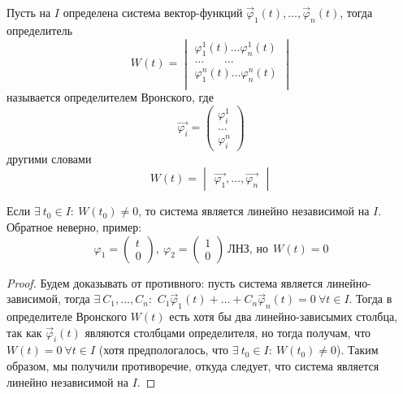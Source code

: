 \begin{definition}
    Пусть на $I$ определена система вектор-функций $\vec \varphi_1(t), \dots, \vec \varphi_n(t)$, тогда определитель
    \begin{equation}
        W(t) = 
        \begin{vmatrix}
            \varphi^1_1(t) \dots \varphi^1_n(t) \\
            \dots ~~~~~~~~ \dots \\
            \varphi^n_1(t) \dots \varphi^n_n(t) \\
        \end{vmatrix}
    \end{equation}
    называется определителем Вронского, где
    \begin{equation}
        \vec{\varphi_i} = 
        \begin{pmatrix}
            \varphi_i^1 \\
            \dots \\
            \varphi_i^n
        \end{pmatrix}
    \end{equation}
    другими словами
    \begin{equation}
    W(t) = 
    \begin{vmatrix}
    \vec{\varphi_1}, \dots, \vec{\varphi_n}
    \end{vmatrix}
    \end{equation}
\end{definition}

\begin{theorem}
    Если $\exists ~ t_0 \in I : ~ W(t_0) \neq 0$, то система является линейно независимой на $I$. Обратное неверно,
    пример:
    \begin{equation}
        \varphi_1 = 
        \begin{pmatrix}
            t \\
            0
        \end{pmatrix}, ~
        \varphi_2 = 
        \begin{pmatrix}
            1 \\
            0
        \end{pmatrix} ~ \text{ЛНЗ, но} ~~ W(t) = 0
    \end{equation}
\end{theorem}

\begin{proof}
    Будем доказывать от противного: пусть система является линейно-зависимой, тогда $\exists ~ C_1, \dots, C_n:$
    $C_1 \vec \varphi_1(t) + \dots + C_n \vec \varphi_n(t) = 0 ~ \forall t \in I$. Тогда в определителе Вронского $W(t)$
    есть хотя бы два линейно-зависымих столбца, так как $\vec \varphi_i(t)$ являются столбцами определителя, но тогда получам, что
    $W(t) = 0 ~ \forall t \in I$ (хотя предпологалось, что $\exists ~ t_0 \in I : ~ W(t_0) \neq 0$). Таким образом, мы получили противоречие,
    откуда следует, что система является линейно независимой на $I$.
\end{proof}

